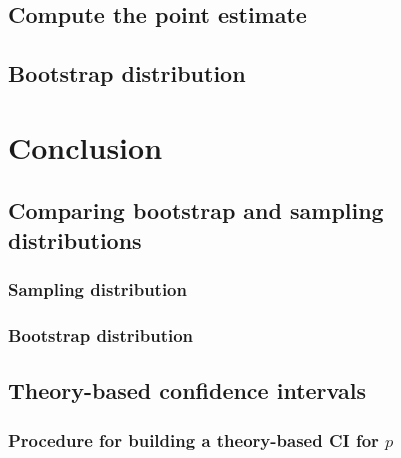 \documentclass[
  12pt, krantz2,
]{krantz}
\begin{document}
\hypertarget{compute-the-point-estimate}{%
\subsection{Compute the point estimate}\label{compute-the-point-estimate}}

\hypertarget{bootstrap-distribution}{%
\subsection{Bootstrap distribution}\label{bootstrap-distribution}}

\hypertarget{ci-conclusion}{%
\section{Conclusion}\label{ci-conclusion}}

\hypertarget{comparing-bootstrap-and-sampling-distributions}{%
\subsection{Comparing bootstrap and sampling distributions}\label{comparing-bootstrap-and-sampling-distributions}}

\hypertarget{sampling-distribution}{%
\subsubsection*{Sampling distribution}\label{sampling-distribution}}


\hypertarget{bootstrap-distribution-1}{%
\subsubsection*{Bootstrap distribution}\label{bootstrap-distribution-1}}


\hypertarget{theory-ci}{%
\subsection{Theory-based confidence intervals}\label{theory-ci}}

\hypertarget{procedure-for-building-a-theory-based-ci-for-p}{%
\subsubsection*{\texorpdfstring{Procedure for building a theory-based CI for \(p\)}{Procedure for building a theory-based CI for p}}\label{procedure-for-building-a-theory-based-ci-for-p}}
\end{document}
